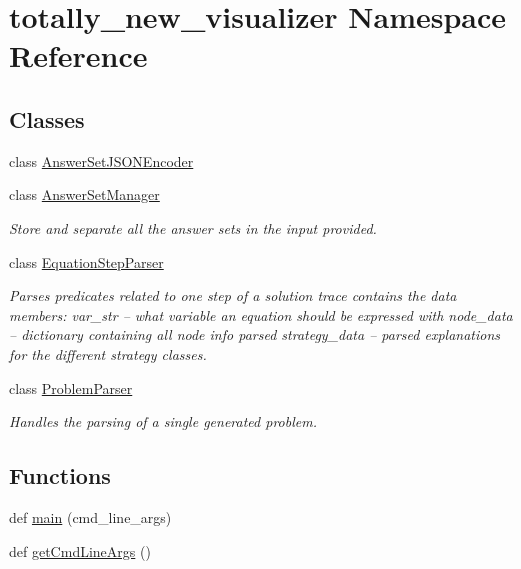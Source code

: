 \hypertarget{namespacetotally__new__visualizer}{}\section{totally\+\_\+new\+\_\+visualizer Namespace Reference}
\label{namespacetotally__new__visualizer}
\subsection*{Classes}
\begin{DoxyCompactItemize}
\item 
class \hyperlink{classtotally__new__visualizer_1_1_answer_set_j_s_o_n_encoder}{Answer\+Set\+J\+S\+O\+N\+Encoder}
\item 
class \hyperlink{classtotally__new__visualizer_1_1_answer_set_manager}{Answer\+Set\+Manager}
\begin{DoxyCompactList}\small\item\em Store and separate all the answer sets in the input provided. \end{DoxyCompactList}\item 
class \hyperlink{classtotally__new__visualizer_1_1_equation_step_parser}{Equation\+Step\+Parser}
\begin{DoxyCompactList}\small\item\em Parses predicates related to one step of a solution trace contains the data members\+: var\+\_\+str -- what variable an equation should be expressed with node\+\_\+data -- dictionary containing all node info parsed strategy\+\_\+data -- parsed explanations for the different strategy classes. \end{DoxyCompactList}\item 
class \hyperlink{classtotally__new__visualizer_1_1_problem_parser}{Problem\+Parser}
\begin{DoxyCompactList}\small\item\em Handles the parsing of a single generated problem. \end{DoxyCompactList}\end{DoxyCompactItemize}
\subsection*{Functions}
\begin{DoxyCompactItemize}
\item 
def \hyperlink{namespacetotally__new__visualizer_aa58bcbc4c3c0a513fa8d58155d9d6e46}{main} (cmd\+\_\+line\+\_\+args)
\item 
def \hyperlink{namespacetotally__new__visualizer_a5ed81f6c9d94b6894d3ba36844436f9e}{get\+Cmd\+Line\+Args} ()
\end{DoxyCompactItemize}
